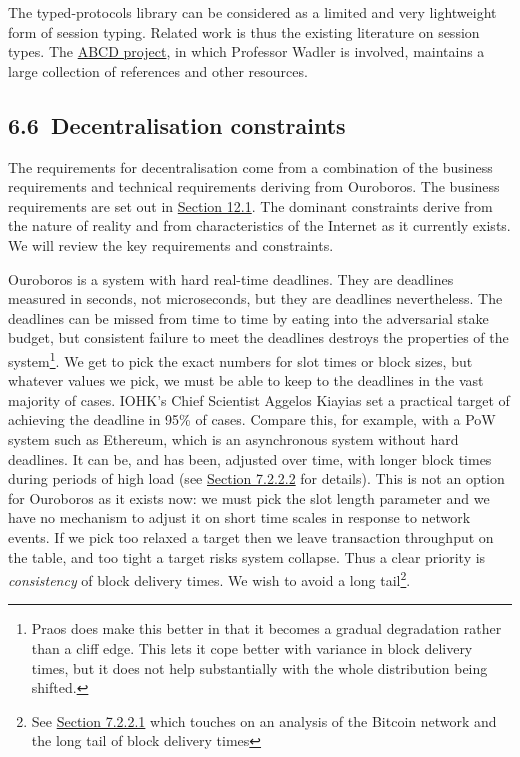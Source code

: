 \documentclass[11pt,a4paper]{article}
\begin{document}
The typed-protocols library can be considered as a limited and very
lightweight form of session typing. Related work is thus the existing
literature on session types. The
\href{https://groups.inf.ed.ac.uk/abcd/}{{ABCD project}}, in which
Professor Wadler is involved, maintains a large collection of references
and other resources.

\hypertarget{decentralisation-constraints}{%
\subsection{​6.6​~Decentralisation
constraints}\label{decentralisation-constraints}}

The requirements for decentralisation come from a combination of the
business requirements and technical requirements deriving from
Ouroboros. The business requirements are set out in
\protect\hyperlink{business-requirements}{{Section 12.1}}. The dominant
constraints derive from the nature of reality and from characteristics
of the Internet as it currently exists. We will review the key
requirements and constraints.

Ouroboros is a system with hard real-time deadlines. They are deadlines
measured in seconds, not microseconds, but they are deadlines
nevertheless. The deadlines can be missed from time to time by eating
into the adversarial stake budget, but consistent failure to meet the
deadlines destroys the properties of the system\footnote{Praos does make
  this better in that it becomes a gradual degradation rather than a
  cliff edge. This lets it cope better with variance in block delivery
  times, but it does not help substantially with the whole distribution
  being shifted.}. We get to pick the exact numbers for slot times or
block sizes, but whatever values we pick, we must be able to keep to the
deadlines in the vast majority of cases. IOHK's Chief Scientist Aggelos
Kiayias set a practical target of achieving the deadline in 95\% of
cases. Compare this, for example, with a PoW system such as Ethereum,
which is an asynchronous system without hard deadlines. It can be, and
has been, adjusted over time, with longer block times during periods of
high load (see \protect\hyperlink{ethereum}{{Section 7.2.2.2}} for
details). This is not an option for Ouroboros as it exists now: we must
pick the slot length parameter and we have no mechanism to adjust it on
short time scales in response to network events. If we pick too relaxed
a target then we leave transaction throughput on the table, and too
tight a target risks system collapse. Thus a clear priority is
\emph{consistency} of block delivery times. We wish to avoid a long
tail\footnote{See \protect\hyperlink{bitcoin}{{Section 7.2.2.1}} which
  touches on an analysis of the Bitcoin network and the long tail of
  block delivery times}.
\end{document}

